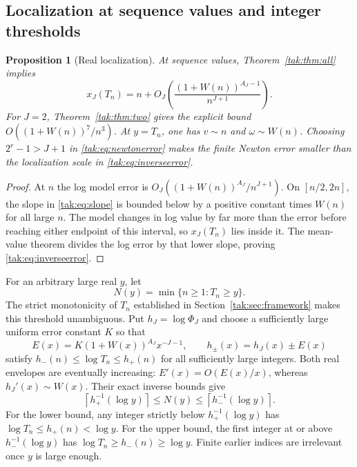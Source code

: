 \documentclass[11pt,letterpaper]{article}
\newtheorem{proposition}[theorem]{Proposition}
\theoremstyle{remark}\newtheorem{remark}[theorem]{Remark}
\begin{document}
\subsection{Localization at sequence values and integer thresholds}

\begin{proposition}[Real localization]\label{tak:prop:inverse}
At sequence values, Theorem~\ref{tak:thm:all} implies
\begin{equation}
 x_J(T_n)=n+O_J\!\left(\frac{(1+W(n))^{A_J-1}}{n^{J+1}}\right).\label{tak:eq:inverseerror}
\end{equation}
For $J=2$, Theorem~\ref{tak:thm:two} gives the explicit bound $O((1+W(n))^7/n^3)$. At $y=T_n$, one has $v\sim n$ and $\omega\sim W(n)$. Choosing $2^r-1>J+1$ in \eqref{tak:eq:newtonerror} makes the finite Newton error smaller than the localization scale in \eqref{tak:eq:inverseerror}.
\end{proposition}
\begin{proof}
At $n$ the log model error is $O_J((1+W(n))^{A_J}/n^{J+1})$. On $[n/2,2n]$, the slope in \eqref{tak:eq:slope} is bounded below by a positive constant times $W(n)$ for all large $n$. The model changes in log value by far more than the error before reaching either endpoint of this interval, so $x_J(T_n)$ lies inside it. The mean-value theorem divides the log error by that lower slope, proving \eqref{tak:eq:inverseerror}.
\end{proof}

For an arbitrary large real $y$, let
\[
 N(y)=\min\{n\geq1:T_n\geq y\}.
\]
The strict monotonicity of $T_n$ established in Section~\ref{tak:sec:framework} makes this threshold unambiguous. Put $h_J=\log\Phi_J$ and choose a sufficiently large uniform error constant $K$ so that
\[
 E(x)=K(1+W(x))^{A_J}x^{-J-1},\qquad h_\pm(x)=h_J(x)\pm E(x)
\]
satisfy $h_-(n)\leq\log T_n\leq h_+(n)$ for all sufficiently large integers. Both real envelopes are eventually increasing: $E'(x)=O(E(x)/x)$, whereas $h_J'(x)\sim W(x)$. Their exact inverse bounds give
\begin{equation}
 \left\lceil h_+^{-1}(\log y)\right\rceil\leq N(y)
                 \leq\left\lceil h_-^{-1}(\log y)\right\rceil.\label{tak:eq:envelopes}
\end{equation}
For the lower bound, any integer strictly below $h_+^{-1}(\log y)$ has $\log T_n\leq h_+(n)<\log y$. For the upper bound, the first integer at or above $h_-^{-1}(\log y)$ has $\log T_n\geq h_-(n)\geq\log y$. Finite earlier indices are irrelevant once $y$ is large enough.
\end{document}
